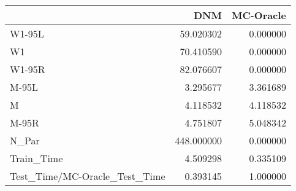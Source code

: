 \begin{tabular}{lrr}
\toprule
{} &         DNM &  MC-Oracle \\
\midrule
W1-95L                        &   59.020302 &   0.000000 \\
W1                            &   70.410590 &   0.000000 \\
W1-95R                        &   82.076607 &   0.000000 \\
M-95L                         &    3.295677 &   3.361689 \\
M                             &    4.118532 &   4.118532 \\
M-95R                         &    4.751807 &   5.048342 \\
N\_Par                         &  448.000000 &   0.000000 \\
Train\_Time                    &    4.509298 &   0.335109 \\
Test\_Time/MC-Oracle\_Test\_Time &    0.393145 &   1.000000 \\
\bottomrule
\end{tabular}
